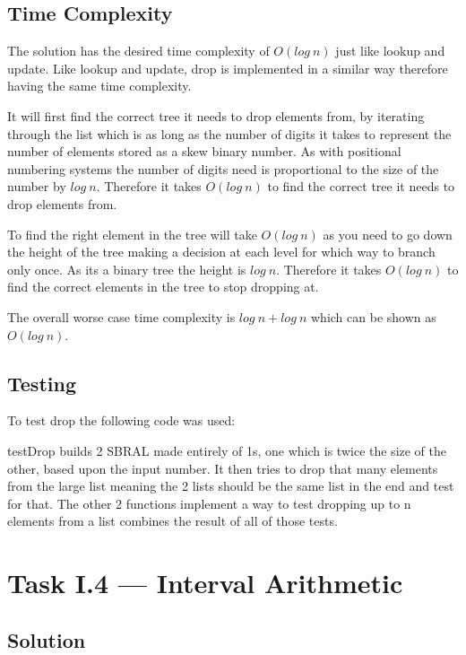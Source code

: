 \documentclass[a4paper]{article}
\begin{document}
\subsection{Time Complexity}
The solution has the desired time complexity of  \( O(log\ n) \) just like lookup and update.
Like lookup and update, drop is implemented in a similar way therefore having the same time complexity.
\par
It will first find the correct tree it needs to drop elements from, by iterating through the list which is as long as the number of digits it takes to represent the number of elements stored as a skew binary number.
As with positional numbering systems the number of digits need is proportional to the size of the number by  \( log\ n \).
Therefore it takes \( O(log\ n) \) to find the correct tree it needs to drop elements from.
\par
To find the right element in the tree will take \( O(log\ n) \) as you need to go down the height of the tree making a decision at each level for which way to branch only once.
As its a binary tree the height is \( log\ n \).
Therefore it takes \( O(log\ n) \) to find the correct elements in the tree to stop dropping at.
\par
The overall worse case time complexity is \( log\ n + log\ n \) which can be shown as \( O(log\ n) \).

\subsection{Testing}
To test drop the following code was used:

\par
testDrop builds 2 SBRAL made entirely of 1s, one which is twice the size of the other, based upon the input number.
It then tries to drop that many elements from the large list meaning the 2 lists should be the same list in the end and test for that.
The other 2 functions implement a way to test dropping up to n elements from a list combines the result of all of those tests.

\section{Task I.4 --- Interval Arithmetic}
\subsection{Solution}
\end{document}
